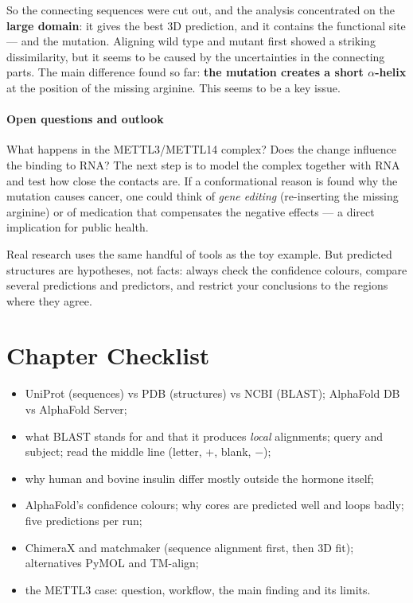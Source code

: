 \documentclass[11pt, oneside]{book}
\let\originalsection\section
\renewcommand{\section}{\Needspace{7\baselineskip}\originalsection}
\begin{document}
So the connecting sequences were cut out, and the analysis concentrated on the
\textbf{large domain}: it gives the best 3D prediction, and it contains the
functional site --- and the mutation. Aligning wild type and mutant first
showed a striking dissimilarity, but it seems to be caused by the uncertainties
in the connecting parts. The main difference found so far: \textbf{the mutation
creates a short $\alpha$-helix} at the position of the missing arginine. This
seems to be a key issue.

\paragraph{Open questions and outlook}
What happens in the METTL3/METTL14 complex? Does the change influence the
binding to RNA? The next step is to model the complex together with RNA and
test how close the contacts are. If a conformational reason is found why the
mutation causes cancer, one could think of \emph{gene editing} (re-inserting
the missing arginine) or of medication that compensates the negative effects
--- a direct implication for public health.

\begin{intbox}[title={The lesson}]
Real research uses the same handful of tools as the toy example. But predicted
structures are hypotheses, not facts: always check the confidence colours,
compare several predictions and predictors, and restrict your conclusions to
the regions where they agree.
\end{intbox}

\section{Chapter Checklist}

\begin{itemize}
  \item UniProt (sequences) vs PDB (structures) vs NCBI (BLAST); AlphaFold DB vs
    AlphaFold Server;
  \item what BLAST stands for and that it produces \emph{local} alignments;
    query and subject; read the middle line (letter, +, blank, $-$);
  \item why human and bovine insulin differ mostly outside the hormone itself;
  \item AlphaFold's confidence colours; why cores are predicted well and loops
    badly; five predictions per run;
  \item ChimeraX and matchmaker (sequence alignment first, then 3D fit);
    alternatives PyMOL and TM-align;
  \item the METTL3 case: question, workflow, the main finding and its limits.
\end{itemize}
\end{document}
